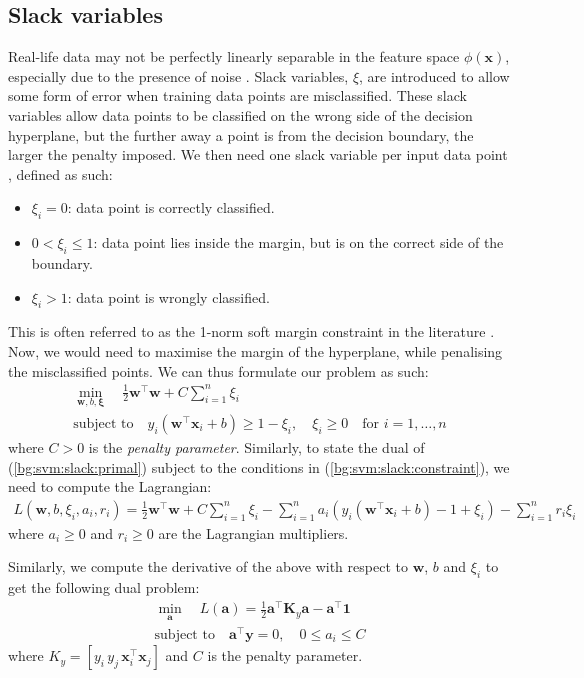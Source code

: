 \documentclass[12pt, twoside, a4paper]{report}
\def\vec{\boldsymbol}
\begin{document}
\subsection{Slack variables}
Real-life data may not be perfectly linearly separable in the feature space $\phi(\vec{x})$, especially due to the presence of noise \cite{RefWorks:127}. Slack variables, $\xi$, are introduced to allow some form of error when training data points are misclassified. These slack variables allow data points to be classified on the wrong side of the decision hyperplane, but the further away a point is from the decision boundary, the larger the penalty imposed. We then need one slack variable per input data point \cite{RefWorks:126}, defined as such:
\begin{itemize}
\item $\xi_i = 0$: data point is correctly classified.
\item $0 < \xi_i \leq 1$: data point lies inside the margin, but is on the correct side of the boundary.
\item $\xi_i > 1$: data point is wrongly classified.
\end{itemize}

This is often referred to as the 1-norm soft margin constraint in the literature \cite{RefWorks:127}. Now, we would need to maximise the margin of the hyperplane, while penalising the misclassified points. We can thus formulate our problem as such:
\begin{gather}
\min_{\vec{w}, b, \vec{\xi}} \quad \frac{1}{2}\vec{w}^\top \vec{w} + C \sum_{i=1}^n \xi_i \label{bg:svm:slack:primal} \\
\text{subject to} \quad y_i(\vec{w}^\top \vec{x}_i + b) \geq 1 - \xi_i , \quad 
\xi_i \geq 0 \quad \text{for $i = 1, \dots , n$}\label{bg:svm:slack:constraint}
\end{gather}
where $C>0$ is the \textit{penalty parameter}. Similarly, to state the dual of (\ref{bg:svm:slack:primal}) subject to the conditions in (\ref{bg:svm:slack:constraint}), we need to compute the Lagrangian:
\begin{align*}
L(\vec{w}, b, \xi_i, a_i, r_i) =
\frac{1}{2} \vec{w}^\top \vec{w} + C \sum_{i=1}^n \xi_i - \sum_{i=1}^n a_i(y_i(\vec{w}^\top \vec{x}_i + b) - 1 + \xi_i) - \sum_{i=1}^n r_i\xi_i
\end{align*}
where $a_i \geq 0$ and $r_i \geq 0$ are the Lagrangian multipliers.

Similarly, we compute the derivative of the above with respect to $\vec{w}$, $b$ and $\xi_i$ to get the following dual problem:
\begin{gather}
\min_{\vec{a}} \quad L(\vec{a}) = \frac{1}{2}\vec{a}^\top \vec{K}_y \vec{a} - \vec{a}^\top \vec{1} \label{bg:svm:quadprob} \\
\text{subject to} \quad \vec{a}^\top \vec{y} = 0, \quad 0 \leq a_i \leq C 
\end{gather}
where $K_y = [y_i \, y_j \, \vec{x}_i^\top \vec{x}_j]$ and $C$ is the penalty parameter.
\end{document}
